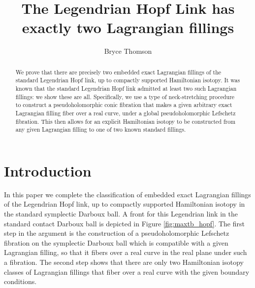 \documentclass[10pt]{amsart}
\theoremstyle{plain}
\theoremstyle{definition}
\numberwithin{equation}{section}
\begin{document}
\title{The Legendrian Hopf Link has exactly two Lagrangian fillings}
	


    \author{Bryce Thomson}
	\address{University of California Davis, Dept. of Mathematics, USA}
	 

\begin{abstract}
We prove that there are precisely two embedded exact Lagrangian fillings of the standard Legendrian Hopf link, up to compactly supported Hamiltonian isotopy. It was known that the standard Legendrian Hopf link admitted at least two such Lagrangian fillings: we show these are all. Specifically, we use a type of neck-stretching procedure to construct a pseudoholomorphic conic fibration that makes a given arbitrary exact Lagrangian filling fiber over a real curve, under a global pseudoholomorphic Lefschetz fibration. This then allows for an explicit Hamiltonian isotopy to be constructed from any given Lagrangian filling to one of two known standard fillings.
\end{abstract}

\maketitle




\section{Introduction}\label{sec:intro}
In this paper we complete the classification of embedded exact Lagrangian fillings of the Legendrian Hopf link, up to compactly supported Hamiltonian isotopy in the standard symplectic Darboux ball. A front for this Legendrian link in the standard contact Darboux ball is depicted in Figure \ref{fig:maxtb_hopf}. The first step in the argument is the construction of a pseudoholomorphic Lefschetz fibration on the symplectic Darboux ball which is compatible with a given Lagrangian filling, so that it fibers over a real curve in the real plane under such a fibration. The second step shows that there are only two Hamiltonian isotopy classes of Lagrangian fillings that fiber over a real curve with the given boundary conditions.
\end{document}
